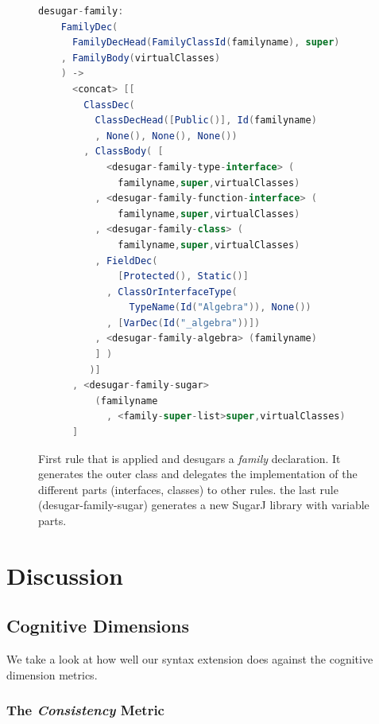 \documentclass{report}
\begin{document}
\begin{figure}[H]
\begin{lstlisting}[language=java,breaklines=false,morekeywords={familyname,super,virtualClasses},keywordstyle=\bfseries\color{OliveGreen}]
  desugar-family:
    FamilyDec(
      FamilyDecHead(FamilyClassId(familyname), super)
    , FamilyBody(virtualClasses)
    ) ->
      <concat> [[
        ClassDec(
          ClassDecHead([Public()], Id(familyname)
          , None(), None(), None())
        , ClassBody( [
            <desugar-family-type-interface> (
              familyname,super,virtualClasses)
          , <desugar-family-function-interface> (
              familyname,super,virtualClasses)
          , <desugar-family-class> (
              familyname,super,virtualClasses)
          , FieldDec(
              [Protected(), Static()]
            , ClassOrInterfaceType(
                TypeName(Id("Algebra")), None())
            , [VarDec(Id("_algebra"))])
          , <desugar-family-algebra> (familyname)
          ] )
	     )]
      , <desugar-family-sugar>
          (familyname
            , <family-super-list>super,virtualClasses)
      ]
\end{lstlisting}
\caption{First rule that is applied and desugars a \emph{family} declaration. It generates the outer class and delegates the implementation of the different parts (interfaces, classes) to other rules. the last rule (desugar-family-sugar) generates a new SugarJ library with variable parts.}
\label{exampleStrategoClassInterfaceTranslation}
\end{figure}





\section{Discussion}

\subsection{Cognitive Dimensions}

We take a look at how well our syntax extension does against the cognitive dimension metrics.

\subsubsection*{The \emph{Consistency} Metric}
\end{document}
